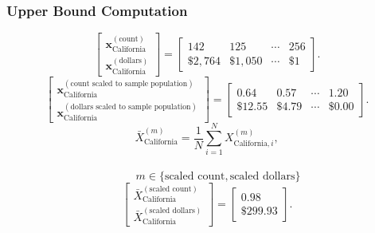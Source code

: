 \subsubsection{Upper Bound Computation}
\[
\begin{bmatrix}
\mathbf{x}_{\text{California}}^{(\text{count})}\\
\mathbf{x}_{\text{California}}^{(\text{dollars})}
\end{bmatrix}
=
\begin{bmatrix}
142 & 125 & \cdots & 256\\
\$2{,}764 &\$1{,}050  & \cdots &\$1 
\end{bmatrix}.
\]
\[
\begin{bmatrix}
\mathbf{x}_{\text{California}}^{(\text{count scaled to sample population})}\\
\mathbf{x}_{\text{California}}^{(\text{dollars scaled to sample population})}
\end{bmatrix}
=
\begin{bmatrix}
0.64 & 0.57 & \cdots & 1.20\\
\$12.55 &\$4.79 & \cdots &\$0.00
\end{bmatrix}.
\]
\[
\bar{X}_{\text{California}}^{(m)}
= \frac{1}{N}\sum_{i=1}^{N} X_{\text{California},i}^{(m)},
\]
\\
\[
\qquad
m \in \{\text{scaled count},\text{scaled dollars}\}
\]
\[
\begin{bmatrix}
\bar{X}_{\text{California}}^{(\text{scaled count})}\\
\bar{X}_{\text{California}}^{(\text{scaled dollars})}
\end{bmatrix}
=
\begin{bmatrix}
0.98\\
\$299.93
\end{bmatrix}.
\]
